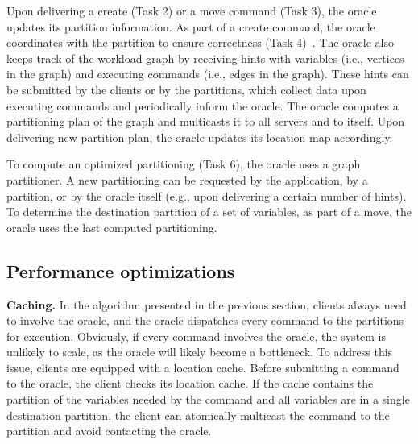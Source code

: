 Upon delivering a create (Task 2) or a move command (Task 3), the oracle updates its partition information.
As part of a create command, the oracle coordinates with the partition to ensure correctness (Task 4)~\cite{bezerra2014ssmr}.
%
The oracle also keeps track of the workload graph by receiving hints with variables (i.e., vertices in the graph) and executing commands (i.e., edges in the graph). These hints can be submitted by the clients or by the partitions, which collect data upon executing commands and periodically inform the oracle.
The oracle computes a partitioning plan of the graph and multicasts it to all servers and to itself. Upon delivering new partition plan, the oracle updates its location map accordingly.

To compute an optimized partitioning (Task 6), the oracle uses a graph partitioner.
A new partitioning can be requested by the application, by a partition, or by the oracle itself (e.g., upon delivering a certain number of hints).
To determine the destination partition of a set of variables, as part of a move, the oracle uses 
the last computed partitioning.


\subsection{Performance optimizations}
\label{sec:optm}

\textbf{Caching.} In the algorithm presented in the previous section, clients always need to involve the oracle, and the oracle dispatches every command to the partitions for execution.
Obviously, if every command involves the oracle, the system is unlikely to scale, as the oracle will likely become a bottleneck.
To address this issue, clients are equipped with a location cache.
Before submitting a command to the oracle, the client checks its location cache.
If the cache contains the partition of the variables needed by the command and all variables are in a single destination partition, the client can atomically multicast the command to the partition and avoid contacting the oracle. 

